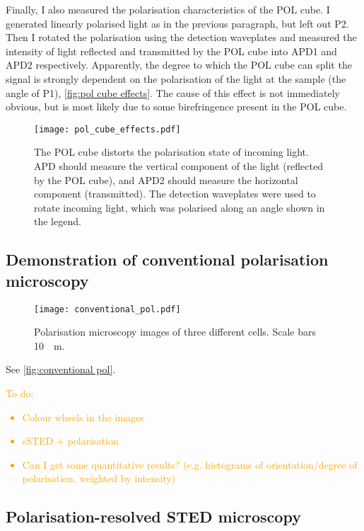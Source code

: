 Finally, I also measured the polarisation characteristics of the POL cube. I generated linearly polarised light as in the previous paragraph, but left out P2. Then I rotated the polarisation using the detection waveplates and measured the intensity of light reflected and transmitted by the POL cube into APD1 and APD2 respectively. Apparently, the degree to which the POL cube can split the signal is strongly dependent on the polarisation of the light at the sample (the angle of P1), \autoref{fig:pol cube effects}. The cause of this effect is not immediately obvious, but is most likely due to some birefringence present in the POL cube. 

\begin{figure}
	\centering
	\texttt{[image: pol\_cube\_effects.pdf]}
	\caption{The POL cube distorts the polarisation state of incoming light. APD should measure the vertical component of the light (reflected by the POL cube), and APD2 should measure the horizontal component (transmitted). The detection waveplates were used to rotate incoming light, which was polarised along an angle shown in the legend.}
	\label{fig:pol cube effects}
\end{figure}

\subsection{Demonstration of conventional polarisation microscopy}

\begin{figure}
	\centering
	\texttt{[image: conventional\_pol.pdf]}
	\caption{
		Polarisation microscopy images of three different cells. Scale bars \SI{10}{\mu m}.
	}
	\label{fig:conventional pol}
\end{figure}

See \autoref{fig:conventional pol}.
\textcolor{orange}{
	To do:
	\begin{itemize}
		\item Colour wheels in the images
		\item sSTED + polarisation
		\item Can I get some quantitative results? (e.g. histograms of orientation/degree of polarisation, weighted by intensity)
	\end{itemize}
} 

\subsection{Polarisation-resolved STED microscopy}

